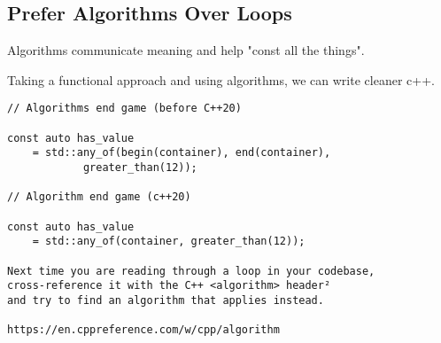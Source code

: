 \subsection{Prefer Algorithms Over Loops}

Algorithms communicate meaning and help "const all the things".

Taking a functional approach and using algorithms, we can write cleaner c++.

\begin{verbatim}
// Algorithms end game (before C++20)

const auto has_value
    = std::any_of(begin(container), end(container), 
            greater_than(12));

// Algorithm end game (c++20)

const auto has_value
    = std::any_of(container, greater_than(12));

Next time you are reading through a loop in your codebase,
cross-reference it with the C++ <algorithm> header²
and try to find an algorithm that applies instead.

https://en.cppreference.com/w/cpp/algorithm
\end{verbatim}
